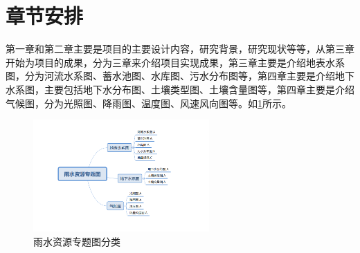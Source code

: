 \section{章节安排}
第一章和第二章主要是项目的主要设计内容，研究背景，研究现状等等，从第三章开始为项目的成果，分为三章来介绍项目实现成果，第三章主要是介绍地表水系图，分为河流水系图、蓄水池图、水库图、污水分布图等，第四章主要是介绍地下水系图，主要包括地下水分布图、土壤类型图、土壤含量图等，第四章主要是介绍气候图，分为光照图、降雨图、温度图、风速风向图等。如\ref{fig:dirforest}所示。
\begin{figure}[!htb]%
  \centering
  \includegraphics[width=0.60\textwidth]{figs/tree.png}
  \caption{雨水资源专题图分类}
  \label{fig:dirforest}
\end{figure}

%

%

%
%






